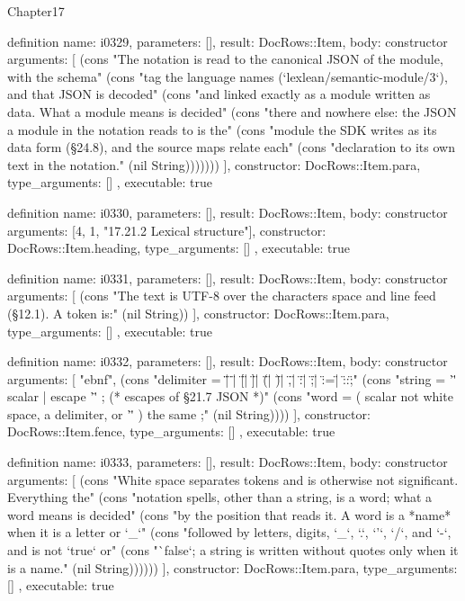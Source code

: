 \begin{lexlean}{Chapter17}
\begin{semanticmodule}
definition{
  name: i0329,
  parameters: [],
  result: DocRows::Item,
  body: constructor{
    arguments: [
      (cons "The notation is read to the canonical JSON of the module, with the schema" (cons "tag the language names (`lexlean/semantic-module/3`), and that JSON is decoded" (cons "and linked exactly as a module written as data. What a module means is decided" (cons "there and nowhere else: the JSON a module in the notation reads to is the" (cons "module the SDK writes as its data form (§24.8), and the source maps relate each" (cons "declaration to its own text in the notation." (nil String)))))))
    ],
    constructor: DocRows::Item.para,
    type_arguments: []
  },
  executable: true
}

definition{
  name: i0330,
  parameters: [],
  result: DocRows::Item,
  body: constructor{
    arguments: [4, 1, "17.21.2 Lexical structure"],
    constructor: DocRows::Item.heading,
    type_arguments: []
  },
  executable: true
}

definition{
  name: i0331,
  parameters: [],
  result: DocRows::Item,
  body: constructor{
    arguments: [
      (cons "The text is UTF-8 over the characters space and line feed (§12.1). A token is:" (nil String))
    ],
    constructor: DocRows::Item.para,
    type_arguments: []
  },
  executable: true
}

definition{
  name: i0332,
  parameters: [],
  result: DocRows::Item,
  body: constructor{
    arguments: [
      "ebnf",
      (cons "delimiter = \"{\" | \"}\" | \"[\" | \"]\" | \"(\" | \")\" | \",\" | \":\" | \";\" | \":=\" | \"::\" ;" (cons "string    = '\"' { scalar | escape } '\"' ;           (* escapes of §21.7 JSON *)" (cons "word      = ( scalar not white space, a delimiter, or '\"' ) { the same } ;" (nil String))))
    ],
    constructor: DocRows::Item.fence,
    type_arguments: []
  },
  executable: true
}

definition{
  name: i0333,
  parameters: [],
  result: DocRows::Item,
  body: constructor{
    arguments: [
      (cons "White space separates tokens and is otherwise not significant. Everything the" (cons "notation spells, other than a string, is a word; what a word means is decided" (cons "by the position that reads it. A word is a *name* when it is a letter or `_`" (cons "followed by letters, digits, `_`, `.`, `'`, `/`, and `-`, and is not `true` or" (cons "`false`; a string is written without quotes only when it is a name." (nil String))))))
    ],
    constructor: DocRows::Item.para,
    type_arguments: []
  },
  executable: true
}


\end{semanticmodule}
\end{lexlean}
